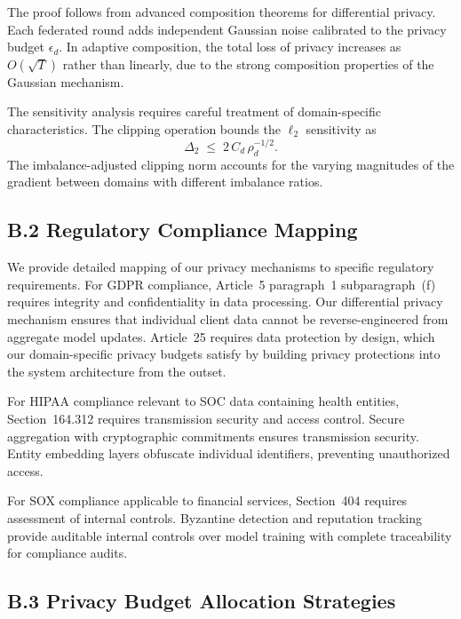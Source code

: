 \documentclass[12pt,a4paper]{article}
\theoremstyle{definition}
\begin{document}
The proof follows from advanced composition theorems for differential privacy. Each federated round adds independent Gaussian noise calibrated to the privacy budget \(\epsilon_d\). In adaptive composition, the total loss of privacy increases as \(O(\sqrt{T})\) rather than linearly, due to the strong composition properties of the Gaussian mechanism.

The sensitivity analysis requires careful treatment of domain-specific characteristics. The clipping operation bounds the \(\ell_2\) sensitivity as
\[
\Delta_{2}\;\le\;2\,C_d\,\rho_d^{-1/2}.
\]
The imbalance-adjusted clipping norm accounts for the varying magnitudes of the gradient between domains with different imbalance ratios.

\endgroup

\subsection{B.2 Regulatory Compliance Mapping}

\begingroup
\setlength{\emergencystretch}{2em}

We provide detailed mapping of our privacy mechanisms to specific regulatory requirements. For GDPR compliance, Article~5 paragraph~1 subparagraph~(f) requires integrity and confidentiality in data processing. Our differential privacy mechanism ensures that individual client data cannot be reverse-engineered from aggregate model updates. Article~25 requires data protection by design, which our domain-specific privacy budgets satisfy by building privacy protections into the system architecture from the outset.

For HIPAA compliance relevant to SOC data containing health entities, Section~164.312 requires transmission security and access control. Secure aggregation with cryptographic commitments ensures transmission security. Entity embedding layers obfuscate individual identifiers, preventing unauthorized access.

For SOX compliance applicable to financial services, Section~404 requires assessment of internal controls. Byzantine detection and reputation tracking provide auditable internal controls over model training with complete traceability for compliance audits.

\endgroup

\subsection{B.3 Privacy Budget Allocation Strategies}
\end{document}
